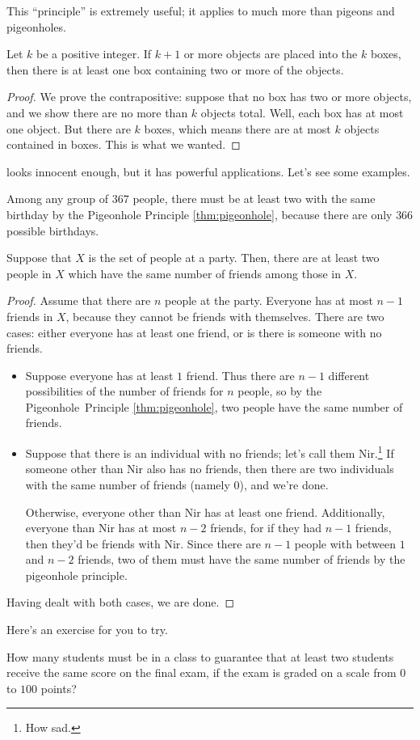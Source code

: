 \documentclass[../main.tex]{subfiles}
\begin{document}
This ``principle'' is extremely useful; it applies to much more than pigeons and pigeonholes.
\begin{theorem} \label{thm:pigeonhole}
    Let $k$ be a positive integer. If $k + 1$ or more objects are placed into the $k$ boxes, then there is at least one box containing two or more of the objects.
\end{theorem}
\begin{proof}
    We prove the contrapositive: suppose that no box has two or more objects, and we show there are no more than $k$ objects total. Well, each box has at most one object. But there are $k$ boxes, which means there are at most $k$ objects contained in boxes. This is what we wanted.
\end{proof}
 looks innocent enough, but it has powerful applications. Let's see some examples.
\begin{example}
    Among any group of $367$ people, there must be at least two with the same birthday by the Pigeonhole Principle \ref{thm:pigeonhole}, because there are only $366$ possible birthdays.
\end{example}
\begin{exe}
    Suppose that $X$ is the set of people at a party.  Then, there are at least two people in $X$ which have the same number of friends among those in $X$.
\end{exe}
\begin{proof}
    Assume that there are $n$ people at the party. Everyone has at most $n - 1$ friends in $X$, because they cannot be friends with themselves. There are two cases: either everyone has at least one friend, or is there is someone with no friends.
    \begin{itemize}
        \item Suppose everyone has at least $1$ friend. Thus there are $n - 1$ different possibilities of the number of friends for $n$ people, so by the Pigeonhole~Principle \ref{thm:pigeonhole}, two people have the same number of friends.
        \item Suppose that there is an individual with no friends; let's call them Nir.\footnote{How sad.} If someone other than Nir also has no friends, then there are two individuals with the same number of friends (namely $0$), and we're done.
        
        Otherwise, everyone other than Nir has at least one friend. Additionally, everyone than Nir has at most $n - 2$ friends, for if they had $n - 1$ friends, then they'd be friends with Nir. Since there are $n - 1$ people with between $1$ and $n - 2$ friends, two of them must have the same number of friends by the pigeonhole principle.
    \end{itemize}
    Having dealt with both cases, we are done.
\end{proof}
Here's an exercise for you to try.
\begin{exe}
    How many students must be in a class to guarantee that at least two students receive the same score on the final exam, if the exam is graded on a scale from $0$ to $100$ points?
\end{exe}
\end{document}
